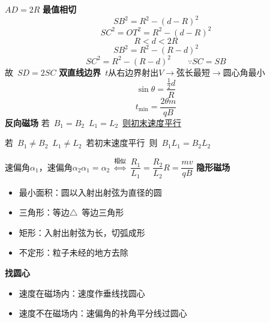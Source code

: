 $AD=2R$
\textbf{最值相切}
\[ SB^2=R^2-(d-R)^2 \]
\[ SC^2=OT^2=R^2-(d-R)^2 \]
\[ R<d<2R \]
\[ SB^2=R^2-(R-d)^2 \]
\[ SC^2=R^2-(R-d)^2 \qquad \because SC=SB \]
故\ $SD=2SC$
\textbf{双直线边界}\ $t$\quad 从右边界射出\quad $V$$\to$弦长最短$\to$圆心角最小
\[ \sin\theta=\frac{\frac12 d}{R} \]
\[ t_{\min}=\frac{2\theta m}{qB} \]
\textbf{反向磁场}
若\ $B_1=B_2$\ $L_1=L_2$\ \underline{则初末速度平行}

若\ $B_1\ne B_2$\ $L_1\ne L_2$\ 若初末速度平行\ 则\ \underline{$B_1L_1=B_2L_2$}

速偏角$\alpha_1$，速偏角$\alpha_2$\quad $\alpha_1=\alpha_2\ \overset{\text{相似}}{\Longleftrightarrow}\ \dfrac{R_1}{L_1}=\dfrac{R_2}{L_2}$\quad $R=\dfrac{mv}{qB}$
\textbf{隐形磁场}
\begin{itemize}
\item 最小面积：圆\quad 以入射出射弦为直径的圆
\item 三角形：等边$\triangle$\ 等边三角形
\item 矩形：入射出射弦为长，切弧成形
\item 不定形：粒子未经的地方去除
\end{itemize}
\textbf{找圆心}
\begin{itemize}
\item 速度在磁场内：速度作垂线找圆心
\item 速度不在磁场内：速偏角的补角平分线过圆心
\end{itemize}
